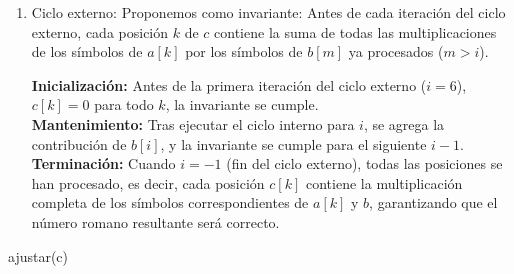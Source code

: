 \documentclass[12pt]{article}
\begin{document}
\begin{itemize}
\begin{enumerate}
        \item Ciclo externo:
        Proponemos como invariante: Antes de cada iteración del ciclo externo, cada posición $k$ de $c$ contiene la suma de todas las multiplicaciones de los símbolos de $a[k]$ por los símbolos de $b[m]$ ya procesados ($m > i$).

        \textbf{Inicialización:} Antes de la primera iteración del ciclo externo ($i=6$), $c[k]=0$ para todo $k$, la invariante se cumple.\\
        \textbf{Mantenimiento:} Tras ejecutar el ciclo interno para $i$, se agrega la contribución de $b[i]$, y la invariante se cumple para el siguiente $i-1$.\\
        \textbf{Terminación:} Cuando $i=-1$ (fin del ciclo externo), todas las posiciones se han procesado, es decir, cada posición $c[k]$ contiene la multiplicación completa de los símbolos correspondientes de $a[k]$ y $b$, garantizando que el número romano resultante será correcto.
    \end{enumerate}

    \begin{algorithm}[H]
    \caption{ajustar(c)}
    \SetAlgoLined
\end{algorithm}
\end{itemize}
\end{document}
